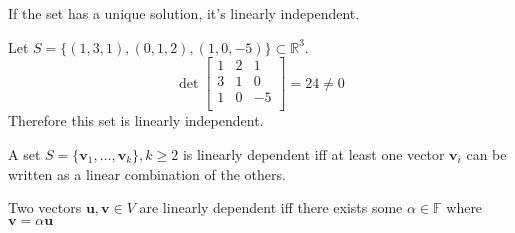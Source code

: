 If the set has a unique solution, it's linearly independent.\\
\begin{eg}
    Let \(S=\{ (1,3,1),(0,1,2),(1,0,-5) \} \subset \mathbb{R} ^3\). 
    \[
        \det \begin{bmatrix}
            1 & 2 &1   \\
            3 & 1 & 0  \\
            1 &0  &  -5 \\
        \end{bmatrix}=24\neq 0
    \]
    Therefore this set is linearly independent. 
\end{eg}
\begin{theorem}
    A set \(S=\{ \mathbf{v} _1,\ldots,\mathbf{v} _k \},k\geq 2 \) is linearly dependent iff at least one vector \(\mathbf{v} _i\) can be written as a linear combination of the others.
\end{theorem}
\begin{corollary}
    Two vectors \(\mathbf{u} ,\mathbf{v} \in V\) are linearly dependent iff there exists some \(\alpha \in \mathbb{F} \) where \(\mathbf{v} =\alpha \mathbf{u} \) 
\end{corollary}
